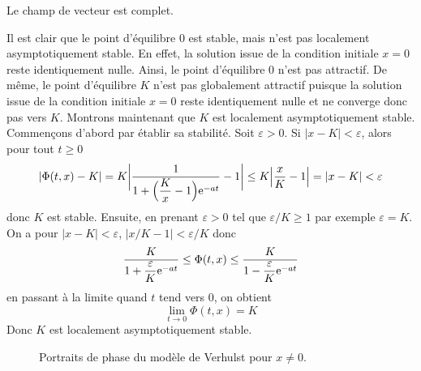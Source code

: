 \begin{remark}
    Le champ de vecteur est complet.
\end{remark}

Il est clair que le point d'équilibre $0$ est stable, mais n'est pas localement asymptotiquement stable. En effet, la solution issue de la condition initiale $x=0$ reste identiquement nulle. Ainsi, le point d'équilibre $0$ n'est pas attractif. De même, le point d'équilibre $K$ n'est pas globalement attractif puisque la solution issue de la condition initiale $x=0$ reste identiquement nulle et ne converge donc pas vers $K$. Montrons maintenant que $K$ est localement asymptotiquement stable. Commençons d'abord par établir sa stabilité. Soit $\varepsilon>0$. Si $|x-K|<\varepsilon$, alors pour tout $t\geq0$
\begin{eqnarray*}
    |\Phi(t,x)-K| = K\bigg|\frac{1}{1+\Big(\dfrac{K}{x}-1\Big)\mathrm{e}^{-at}}-1\bigg| \leq K\Big|\frac{x}{K}-1\Big| = |x-K| < \varepsilon
\end{eqnarray*}
donc $K$ est stable. Ensuite, en prenant $\varepsilon >0$ tel que $\varepsilon / K \geq 1$ par exemple $\varepsilon=K$. On a pour $|x-K| < \varepsilon$, $|x/K - 1| < \varepsilon/K$ donc 
\begin{equation*}
    \frac{K}{1+\dfrac{\varepsilon}{K}\mathrm{e}^{-at}} \leq \Phi(t,x) \leq \frac{K}{1-\dfrac{\varepsilon}{K}\mathrm{e}^{-at}}
\end{equation*}
en passant à la limite quand $t$ tend vers $0$, on obtient 
\begin{equation*}
    \lim_{t \to 0} \Phi(t,x) = K
\end{equation*}
Donc $K$ est localement asymptotiquement stable.

\begin{figure}[H]
\centering
{}
\caption{Portraits de phase du modèle de Verhulst pour $x \neq 0$.}
\label{fig:portrait-verhulst}
\end{figure}

